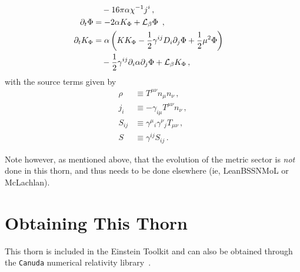 \begin{subequations}
\begin{align}
                    \notag \\
    & \quad - 16 \pi \alpha \chi^{-1} j^i \label{eq:tilde-Gamma-evol} \,, \\
%
  \partial_{t} \Phi & = - 2 \alpha K_\Phi + \mathcal{L}_{\beta} \Phi\
                \,, \label{eq:dtPhi-BSSN} \\
%
  \partial_{t} K_\Phi &  = \alpha \left( K K_{\Phi} - \frac{1}{2} \gamma^{ij} D_i \partial_j \Phi
                  + \frac{1}{2} \mu^2 \Phi \right) \nonumber \\
                 & \quad - \frac{1}{2} \gamma^{ij} \partial_i \alpha \partial_j \Phi
                       + \mathcal{L}_{\beta} K_\Phi \,, \label{eq:dtKphi-BSSN}
  \end{align}
\end{subequations}
%
%
with the source terms given by
%
\begin{equation}
  \label{eq:source}
   \begin{aligned}
  \rho & \equiv T^{\mu \nu}n_{\mu}n_{\nu} \,,\\
  j_i  &\equiv -\gamma_{i\mu} T^{\mu \nu}n_{\nu} \,, \\
  S_{ij} &\equiv \gamma^{\mu}{}_i \gamma^{\nu}{}_j T_{\mu \nu} \,, \\
  S     & \equiv \gamma^{ij}S_{ij} \,.
   \end{aligned}
 \end{equation}

Note however, as mentioned above, that the evolution of the metric sector is \emph{not} done in this thorn, and thus needs to be done elsewhere (ie, LeanBSSNMoL or McLachlan).


\section{Obtaining This Thorn}

This thorn is included in the Einstein Toolkit and can also be obtained through
the \texttt{Canuda} numerical relativity library~\cite{Canuda}.


